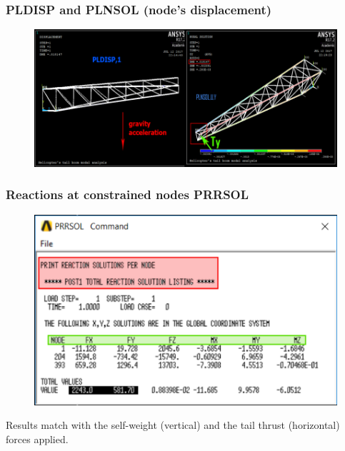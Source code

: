 \subsubsection*{PLDISP and PLNSOL (node's displacement)}
\begin{figure}[h!]
	\begin{center}
		\centering  		 		
		\includegraphics[width=0.95\linewidth]{PICTURES/2_Lama_truss/PNG/displ.png}
	\end{center}
\end{figure}	

\subsubsection*{Reactions at constrained nodes PRRSOL}
\begin{figure}[h!]
	\begin{center}
		\centering  		 		
		\includegraphics[width=0.65\linewidth]{PICTURES/2_Lama_truss/PNG/PRRSOL.png}
	\end{center}
\end{figure}	
\noindent
Results match with the self-weight (vertical) and the tail thrust (horizontal) forces applied. 
\clearpage




